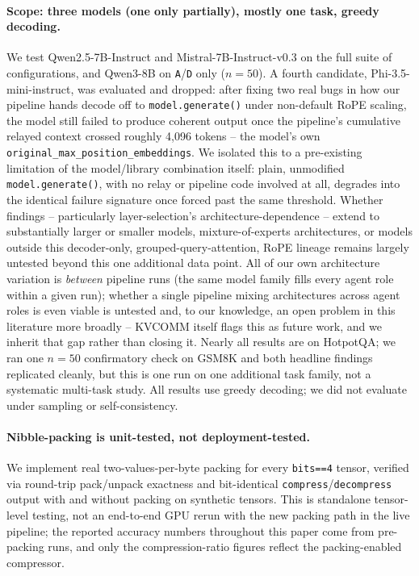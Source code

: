 \documentclass[11pt]{article}
\begin{document}
\paragraph{Scope: three models (one only partially), mostly one task,
greedy decoding.} We test Qwen2.5-7B-Instruct and Mistral-7B-Instruct-v0.3
on the full suite of configurations, and Qwen3-8B on \texttt{A}/\texttt{D}
only ($n=50$). A fourth candidate, Phi-3.5-mini-instruct, was evaluated
and dropped: after fixing two real bugs in how our pipeline hands decode
off to \texttt{model.generate()} under non-default RoPE scaling, the
model still failed to produce coherent output once the pipeline's
cumulative relayed context crossed roughly 4{,}096 tokens -- the model's
own \texttt{original\_max\_position\_embeddings}. We isolated this to a
pre-existing limitation of the model/library combination itself: plain,
unmodified \texttt{model.generate()}, with no relay or pipeline code
involved at all, degrades into the identical failure signature once
forced past the same threshold. Whether findings -- particularly
layer-selection's architecture-dependence -- extend to substantially
larger or smaller models, mixture-of-experts architectures, or models
outside this decoder-only, grouped-query-attention, RoPE lineage remains
largely untested beyond this one additional data point. All of our own
architecture variation is \emph{between} pipeline runs (the same model
family fills every agent role within a given run); whether a single
pipeline mixing architectures across agent roles is even viable is
untested and, to our knowledge, an open problem in this literature more
broadly -- KVCOMM itself flags this as future work, and we inherit that
gap rather than closing it. Nearly all results are on HotpotQA; we ran
one $n=50$ confirmatory check on GSM8K and both headline findings
replicated cleanly, but this is one run on one additional task family,
not a systematic multi-task study. All results use greedy decoding; we
did not evaluate under sampling or self-consistency.

\paragraph{Nibble-packing is unit-tested, not deployment-tested.} We
implement real two-values-per-byte packing for every \texttt{bits==4}
tensor, verified via round-trip pack/unpack exactness and bit-identical
\texttt{compress}/\texttt{decompress} output with and without packing on
synthetic tensors. This is standalone tensor-level testing, not an
end-to-end GPU rerun with the new packing path in the live pipeline; the
reported accuracy numbers throughout this paper come from pre-packing
runs, and only the compression-ratio figures reflect the packing-enabled
compressor.
\end{document}
